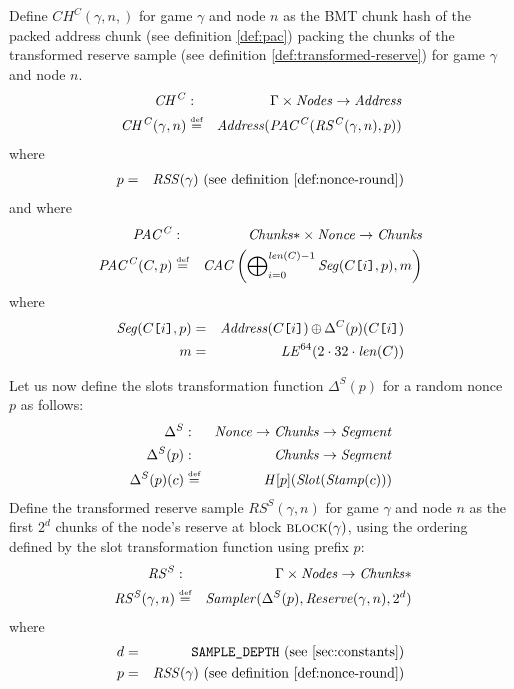 \begin{definition}
\label{def:chc}
Define $\mathit{CH^C}(\gamma,n,)$ for game $\gamma$ and node $n$ as the BMT chunk hash of the packed address chunk (see definition \ref{def:pac}) packing the chunks of the transformed reserve sample (see definition \ref{def:transformed-reserve}) for game $\gamma$ and node $n$.
%
\begin{eqnarray}
\mathit{CH^C}&:&\Gamma\times\mathit{Nodes}\to\mathit{Address}\\
\mathit{CH^C}(\gamma,n)&\overset{\textrm{\tiny def}}{=}&\mathit{Address}(\mathit{PAC^C}(\mathit{RS^C}(\gamma, n), p))
    \end{eqnarray}
where
\begin{eqnarray}
p & = & \mathit{RSS}(\gamma) \text{ (see definition \ref{def:nonce-round})}
\end{eqnarray}
and where 
\begin{eqnarray}
\mathit{PAC^C}&:&\mathit{Chunks}{*}\times\mathit{Nonce}\to\mathit{Chunks}\\
\mathit{PAC^C}(C,p)&\defeq&\mathit{CAC}{}\left(\Concat_{i=0}^{\mathit{len}(C)-1} \mathit{Seg}(C\idx{i},p), m\right)
\end{eqnarray}
where
\begin{eqnarray}
\mathit{Seg}(C\texttt{[}\/i\/\texttt{]},p) &=& \mathit{Address}(C\texttt{[}\/i\/\texttt{]})\operatorname{\operatorname{\oplus}} \Delta^C(p)(C\texttt{[}\/i\/\texttt{]}) \\
m & = & \mathit{LE}^{64}(2\cdot32\cdot\mathit{len}(C))
\end{eqnarray}
\end{definition}

\begin{definition}
\label{def:transformed-slots}
%
Let us now define the slots transformation function $\Delta^S(p)$
for a random nonce $p$ as follows: 
%
\begin{eqnarray}
\Delta^S&:&\mathit{Nonce}\to\mathit{Chunks}\to\mathit{Segment}\\
\Delta^S(p)&:&\mathit{Chunks}\to\mathit{Segment}\\
\Delta^S(p)(c)&\overset{\textrm{\tiny def}}{=}&\mathit{H}[p](\mathit{Slot}(\mathit{Stamp}(c)))
\end{eqnarray}
%
Define the transformed reserve sample $\mathit{RS^S}(\gamma,n)$ for game $\gamma$ and node $n$ as the first $2^d$ chunks  of the node's reserve at block $\textsc{block}(\gamma)$, using the ordering defined by the slot transformation function using prefix $p$:%
\begin{eqnarray}
\mathit{RS^S}&:&\Gamma\times\mathit{Nodes}\to\mathit{Chunks}{*}\\\
\mathit{RS^S}(\gamma,n)&\overset{\textrm{\tiny def}}{=}&\mathit{Sampler}(\Delta^S(p),\mathit{Reserve}(\gamma,n),2^d)
\end{eqnarray}
where 
\begin{eqnarray}
d & = & \texttt{SAMPLE\_DEPTH} \text{ (see \ref{sec:constants})} \\
p & = & \mathit{RSS}(\gamma) \text{ (see definition \ref{def:nonce-round})}
\end{eqnarray}
\end{definition}


